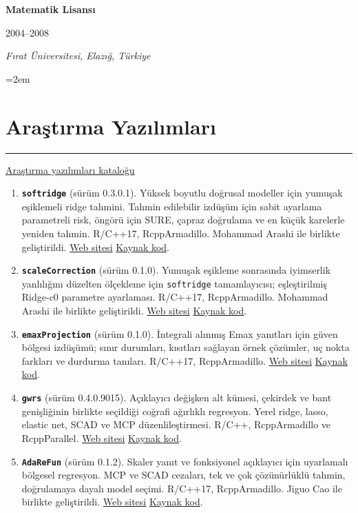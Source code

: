 \documentclass[10pt,a4paper]{article}
\newcommand{\sepspace}{\vspace*{0.65em}}		%
\newcommand{\NewPart}[2]{%
	\Needspace{7\baselineskip}%
	\vspace{0.45em}%
	\section*{\sffamily\large\bfseries\color{MidnightBlue}#1 #2}%
	\vspace{-0.7em}\noindent\color{MidnightBlue}\rule{\textwidth}{0.55pt}\color{Black}\vspace{0.25em}}
\newcommand{\EducationEntry}[4]{
		\noindent \textbf{#1} \hfill      %
		\parbox{11.5em}{%
			\hfill\color{Black}#2} \par  %
		\noindent \textit{#3} \par        %
		\noindent\hangindent=2em\hangafter=0 \small #4 %
		\normalsize \par}
\newenvironment{etaremune}{\begin{enumerate}}{\end{enumerate}}
\begin{document}
\sepspace
\EducationEntry{Matematik Lisansı}{2004--2008}{Fırat Üniversitesi, Elazığ, Türkiye}{}



\clearpage\NewPart{Araştırma Yazılımları}{}

\noindent\href{https://byuzbasi.github.io/software/}{Araştırma yazılımları kataloğu}

\begin{etaremune}
\renewcommand{\theenumi}{A\arabic{enumi}}

\item \textbf{\texttt{softridge}} (sürüm 0.3.0.1). Yüksek boyutlu doğrusal modeller için yumuşak eşiklemeli ridge tahmini. Tahmin edilebilir izdüşüm için sabit ayarlama parametreli risk, öngörü için SURE, çapraz doğrulama ve en küçük karelerle yeniden tahmin. R/C++17, RcppArmadillo. Mohammad Arashi ile birlikte geliştirildi. \href{https://byuzbasi.github.io/softridge/}{Web sitesi} \textbar{} \href{https://github.com/byuzbasi/softridge}{Kaynak kod}.

\item \textbf{\texttt{scaleCorrection}} (sürüm 0.1.0). Yumuşak eşikleme sonrasında iyimserlik yanlılığını düzelten ölçekleme için \texttt{softridge} tamamlayıcısı; eşleştirilmiş Ridge-c0 parametre ayarlaması. R/C++17, RcppArmadillo. Mohammad Arashi ile birlikte geliştirildi. \href{https://byuzbasi.github.io/softridge/scaleCorrection/}{Web sitesi} \textbar{} \href{https://github.com/byuzbasi/softridge/tree/main/companion/scaleCorrection}{Kaynak kod}.

\item \textbf{\texttt{emaxProjection}} (sürüm 0.1.0). İntegrali alınmış Emax yanıtları için güven bölgesi izdüşümü; sınır durumları, kısıtları sağlayan örnek çözümler, uç nokta farkları ve durdurma tanıları. R/C++17, RcppArmadillo. \href{https://byuzbasi.github.io/emaxProjection/}{Web sitesi} \textbar{} \href{https://github.com/byuzbasi/emaxProjection}{Kaynak kod}.

\item \textbf{\texttt{gwrs}} (sürüm 0.4.0.9015). Açıklayıcı değişken alt kümesi, çekirdek ve bant genişliğinin birlikte seçildiği coğrafi ağırlıklı regresyon. Yerel ridge, lasso, elastic net, SCAD ve MCP düzenlileştirmesi. R/C++, RcppArmadillo ve RcppParallel. \href{https://byuzbasi.github.io/gwrs/}{Web sitesi} \textbar{} \href{https://github.com/byuzbasi/gwrs}{Kaynak kod}.

\item \textbf{\texttt{AdaReFun}} (sürüm 0.1.2). Skaler yanıt ve fonksiyonel açıklayıcı için uyarlamalı bölgesel regresyon. MCP ve SCAD cezaları, tek ve çok çözünürlüklü tahmin, doğrulamaya dayalı model seçimi. R/C++17, RcppArmadillo. Jiguo Cao ile birlikte geliştirildi. \href{https://byuzbasi.github.io/AdaReFun/}{Web sitesi} \textbar{} \href{https://github.com/byuzbasi/AdaReFun}{Kaynak kod}.


\end{etaremune}
\end{document}

